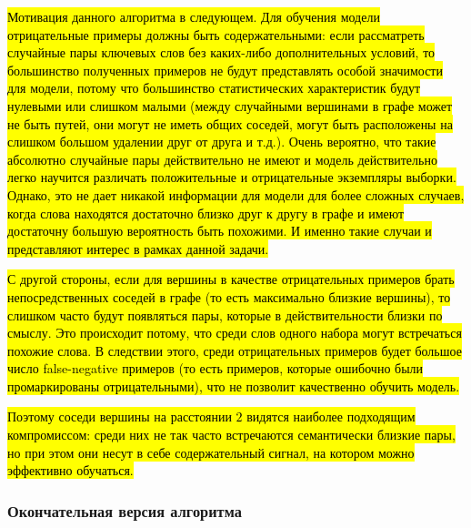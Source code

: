 \hl{Мотивация данного алгоритма в следующем. Для обучения модели отрицательные примеры должны быть содержательными: если рассматреть случайные пары ключевых слов без каких-либо дополнительных условий, то большинство полученных примеров не будут представлять особой значимости для модели, потому что большинство статистических характеристик будут нулевыми или слишком малыми (между случайными вершинами в графе может не быть путей, они могут не иметь общих соседей, могут быть расположены на слишком большом удалении друг от друга и т.д.). Очень вероятно, что такие абсолютно случайные пары действительно не имеют и модель действительно легко научится различать положительные и отрицательные экземпляры выборки. Однако,  это не дает никакой информации для модели для более сложных случаев, когда слова находятся достаточно близко друг к другу в графе и имеют достаточну большую вероятность быть похожими. И именно такие случаи и представляют интерес в рамках данной задачи.}

\hl{С другой стороны, если для вершины в качестве отрицательных примеров брать непосредственных соседей в графе (то есть максимально близкие вершины), то слишком часто будут появляться пары, которые в действительности близки по смыслу. Это происходит потому, что среди слов одного набора могут встречаться похожие слова. В следствии этого, среди отрицательных примеров будет большое число false-negative примеров (то есть примеров, которые ошибочно были промаркированы отрицательными), что не позволит качественно обучить модель.}

\hl{Поэтому соседи вершины на расстоянии $2$ видятся наиболее подходящим компромиссом: среди них не так часто встречаются семантически близкие пары, но при этом они несут в себе содержательный сигнал, на котором можно эффективно обучаться.}
\subsubsection{Окончательная версия алгоритма}

